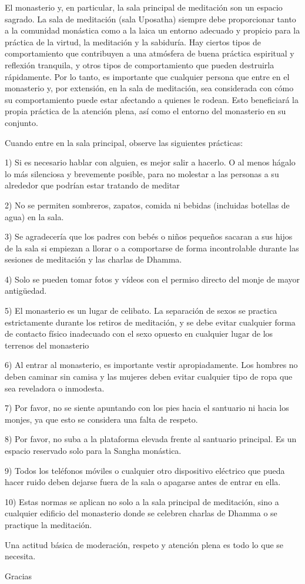 El monasterio y, en particular, la sala principal de meditación son un espacio sagrado. La sala de meditación (sala Uposatha) siempre debe proporcionar tanto a la comunidad monástica como a la laica un entorno adecuado y propicio para la práctica de la virtud, la meditación y la sabiduría. Hay ciertos tipos de comportamiento que contribuyen a una atmósfera de buena práctica espiritual y reflexión tranquila, y otros tipos de comportamiento que pueden destruirla rápidamente. Por lo tanto, es importante que cualquier persona que entre en el monasterio y, por extensión, en la sala de meditación, sea considerada con cómo su comportamiento puede estar afectando a quienes le rodean. Esto beneficiará la propia práctica de la atención plena, así como el entorno del monasterio en su conjunto.

Cuando entre en la sala principal, observe las siguientes prácticas:

1) Si es necesario hablar con alguien, es mejor salir a hacerlo. O al menos hágalo lo más silenciosa y brevemente posible, para no molestar a las personas a su alrededor que podrían estar tratando de meditar

2) No se permiten sombreros, zapatos, comida ni bebidas (incluidas botellas de agua) en la sala.

3) Se agradecería que los padres con bebés o niños pequeños sacaran a sus hijos de la sala si empiezan a llorar o a comportarse de forma incontrolable durante las sesiones de meditación y las charlas de Dhamma.

4) Solo se pueden tomar fotos y vídeos con el permiso directo del monje de mayor antigüedad.

5) El monasterio es un lugar de celibato. La separación de sexos se practica estrictamente durante los retiros de meditación, y se debe evitar cualquier forma de contacto físico inadecuado con el sexo opuesto en cualquier lugar de los terrenos del monasterio

6) Al entrar al monasterio, es importante vestir apropiadamente. Los hombres no deben caminar sin camisa y las mujeres deben evitar cualquier tipo de ropa que sea reveladora o inmodesta.

7) Por favor, no se siente apuntando con los pies hacia el santuario ni hacia los monjes, ya que esto se considera una falta de respeto.

8) Por favor, no suba a la plataforma elevada frente al santuario principal. Es un espacio reservado solo para la Sangha monástica.

9) Todos los teléfonos móviles o cualquier otro dispositivo eléctrico que pueda hacer ruido deben dejarse fuera de la sala o apagarse antes de entrar en ella.

10) Estas normas se aplican no solo a la sala principal de meditación, sino a cualquier edificio del monasterio donde se celebren charlas de Dhamma o se practique la meditación.

Una actitud básica de moderación, respeto y atención plena es todo lo que se necesita.

Gracias





